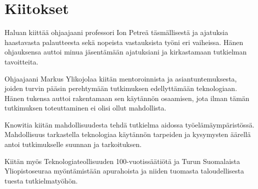 \section*{Kiitokset}

Haluan kiittää ohjaajaani professori Ion Petreä täsmällisestä ja
ajatuksia haastavasta palautteesta sekä nopeista vastauksista työni eri
vaiheissa. Hänen ohjauksensa auttoi minua jäsentämään ajatuksiani
ja kirkastamaan tutkielman tavoitteita.

Ohjaajaani Markus Ylikojolaa kiitän mentoroinnista ja asiantuntemuksesta,
joiden turvin pääsin perehtymään tutkimuksen edellyttämään teknologiaan.
Hänen tukensa auttoi rakentamaan sen käytännön osaamisen, jota ilman
tämän tutkimuksen toteuttaminen ei olisi ollut mahdollista.

Knowitia kiitän mahdollisuudesta tehdä tutkielma aidossa
työelämäympäristössä. Mahdollisuus tarkastella teknologiaa käytännön
tarpeiden ja kysymysten äärellä antoi tutkimukselle suunnan ja
tarkoituksen.

Kiitän myös Teknologiateollisuuden 100-vuotissäätiötä ja Turun Suomalaista
Yliopistoseuraa myöntämistään apurahoista ja niiden tuomasta
taloudellisesta tuesta tutkielmatyöhön.

\clearpage
